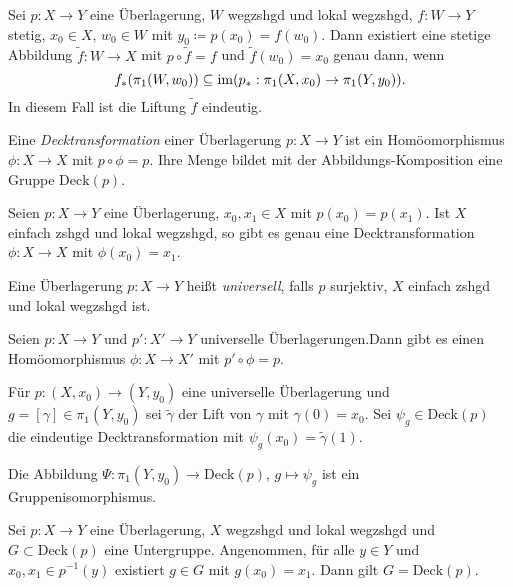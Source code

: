 \documentclass{cheat-sheet}
\newcommand{\Deck}{\mathrm{Deck}} %
\begin{document}
\begin{satz}[Liftungstheorem]
  Sei $p : X \to Y$ eine Überlagerung, $W$ wegzshgd und lokal wegzshgd, $f : W \to Y$ stetig, $x_0 \in X$, $w_0 \in W$ mit $y_0 \coloneqq p(x_0) = f(w_0)$. Dann existiert eine stetige Abbildung $\tilde{f} : W \to X$ mit $p \circ \tilde{f} = f$ und $\tilde{f}(w_0) = x_0$ genau dann, wenn
  \[ f_*(\pi_1(W, w_0)) \subseteq \mathop{\mathrm{im}} (p_* : \pi_1(X, x_0) \to \pi_1(Y, y_0)). \]
  In diesem Fall ist die Liftung $\tilde{f}$ eindeutig.
\end{satz}

\begin{defn}
  Eine \emph{Decktransformation} einer Überlagerung $p : X \to Y$ ist ein Homöomorphismus $\phi : X \to X$ mit $p \circ \phi = p$. Ihre Menge bildet mit der Abbildungs-Komposition eine Gruppe $\Deck(p)$.
\end{defn}

\begin{kor}
  Seien $p : X \to Y$ eine Überlagerung, $x_0, x_1 \in X$ mit $p(x_0) = p(x_1)$. Ist $X$ einfach zshgd und lokal wegzshgd, so gibt es genau eine Decktransformation $\phi : X \to X$ mit $\phi(x_0) = x_1$.
\end{kor}


\begin{defn}
  Eine Überlagerung $p : X \to Y$ heißt \emph{universell}, falls $p$ surjektiv, $X$ einfach zshgd und lokal wegzshgd ist.
\end{defn}

\begin{prop}
  Seien $p : X \to Y$ und $p' : X' \to Y$ universelle Überlagerungen.Dann gibt es einen Homöomorphismus $\phi : X \to X'$ mit $p' \circ \phi = p$.
\end{prop}

Für $p : (X, x_0) \to (Y, y_0)$ eine universelle Überlagerung und $g = [\gamma] \in \pi_1(Y, y_0)$ sei $\tilde{\gamma}$ der Lift von $\gamma$ mit $\gamma(0) = x_0$. Sei $\psi_g \in \Deck(p)$ die eindeutige Decktransformation mit $\psi_g(x_0) = \tilde{\gamma}(1)$.

\begin{prop}
  Die Abbildung $\Psi : \pi_1(Y, y_0) \to \Deck(p)$, $g \mapsto \psi_g$ ist ein Gruppenisomorphismus.
\end{prop}


\begin{prop}
  Sei $p : X \to Y$ eine Überlagerung, $X$ wegzshgd und lokal wegzshgd und $G \subset \Deck(p)$ eine Untergruppe. Angenommen, für alle $y \in Y$ und $x_0, x_1 \in p^{-1}(y)$ existiert $g \in G$ mit $g(x_0) = x_1$. Dann gilt $G = \Deck(p)$.
\end{prop}
\end{document}
